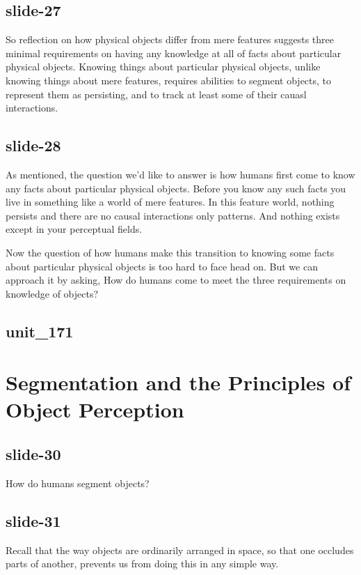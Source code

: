 \documentclass[12pt,\papersize]{extarticle}
\begin{document}
\subsection{slide-27}
So reflection on how physical objects differ from mere features suggests three minimal 
requirements on having any knowledge at all of facts about particular physical objects.
Knowing things about particular physical objects, unlike knowing things about mere features, 
requires abilities to segment objects, to represent them as persisting, and to track at least 
some of their cauasl interactions.
 
\subsection{slide-28}
As mentioned, the question we'd like to answer is how humans first come to know any facts about
particular physical objects.
Before you know any such facts you live in something like a world of mere features.
In this feature world, nothing persists and there are no causal interactions only patterns.
And nothing exists except in your perceptual fields.
 
Now the question of how humans make this transition to knowing some facts about particular 
physical objects is too hard to face head on.  But we can approach it by asking,
How do humans come to meet the three requirements on knowledge of objects?
 
\subsection{unit\_171}
 
 
\section{Segmentation and the Principles of Object Perception}
 
\subsection{slide-30}
How do humans segment objects?
 
\subsection{slide-31}
Recall that the way objects are ordinarily arranged in space, so that one occludes parts of another, prevents us from doing this in any simple way.
 
\end{document}
